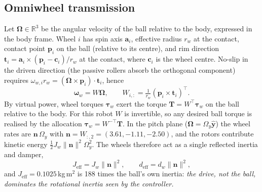 \documentclass[conference]{IEEEtran}
\theoremstyle{remark}
\newcommand{\R}{\mathbb{R}}
\begin{document}
\subsection{Omniwheel transmission}
Let $\bm\Omega\in\R^3$ be the angular velocity of the ball relative to the body, expressed in the body frame. Wheel $i$ has spin axis $\bm a_i$, effective radius $r_{w}$ at the contact, contact point $\bm p_i$ on the ball (relative to its centre), and rim direction $\bm t_i=\bm a_i\times(\bm p_i-\bm c_i)/r_w$ at the contact, where $\bm c_i$ is the wheel centre. No-slip in the driven direction (the passive rollers absorb the orthogonal component) requires $\omega_{w,i} r_w=(\bm\Omega\times\bm p_i)\cdot\bm t_i$, hence
\begin{equation}
\bm\omega_w = W\bm\Omega,\qquad W_{i,:}=\tfrac{1}{r_w}(\bm p_i\times\bm t_i)^{\!\top}.\label{eq:W}
\end{equation}
By virtual power, wheel torques $\bm\tau_w$ exert the torque $\bm T=W^{\!\top}\bm\tau_w$ on the ball relative to the body. For this robot $W$ is invertible, so any desired ball torque is realised by the allocation $\bm\tau_w=W^{-\top}\bm T$. In the pitch plane ($\bm\Omega=\Omega_y\hat{\bm y}$) the wheel rates are $\bm n\,\Omega_y$ with $\bm n=W_{:,2}=(3.61,-1.11,-2.50)$, and the rotors contribute kinetic energy $\tfrac12 J_w\lVert\bm n\rVert^2\Omega_y^2$. The wheels therefore act as a single reflected inertia and damper,
\begin{equation}
J_{\mathrm{eff}}=J_w\lVert\bm n\rVert^2,\qquad d_{\mathrm{eff}}=d_w\lVert\bm n\rVert^2,\label{eq:Jeff}
\end{equation}
and $J_{\mathrm{eff}}=0.1025$\,kg\,m$^2$ is 188 times the ball's own inertia: \emph{the drive, not the ball, dominates the rotational inertia seen by the controller.}
\end{document}

